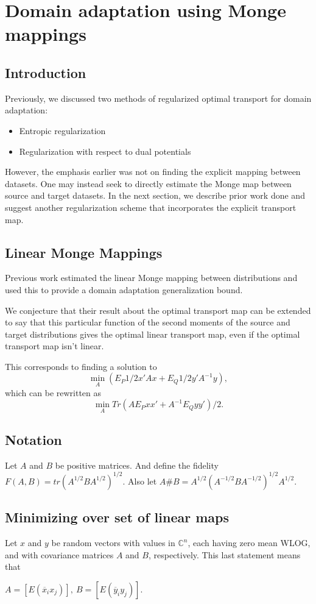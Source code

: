 \chapter{Domain adaptation using Monge mappings}

\section*{Introduction}
Previously, we discussed two methods of regularized optimal transport for domain adaptation:
\begin{itemize}
	\item Entropic regularization
	\item Regularization with respect to dual potentials
\end{itemize}

However, the emphasis earlier was not on finding the explicit mapping between datasets. One may instead seek to directly estimate the Monge map between source and target datasets. In the next section, we describe prior work done and suggest another regularization scheme that incorporates the explicit transport map.

\section*{Linear Monge Mappings}
Previous work \cite{Flamary2019} estimated the linear Monge mapping between distributions and used this to provide a domain adaptation generalization bound.

We conjecture that their result about the optimal transport map can be extended to say that this particular function of the second moments of the source and target distributions gives the optimal linear transport map, even if the optimal transport map isn't linear.

This corresponds to finding a solution to
$$\min_A (E_P 1/2 x'Ax + E_Q 1/2 y'A^{-1}y),$$ which can be rewritten as 
$$\min_A Tr(A E_P xx' + A^{-1} E_Q yy')/2.$$

\section*{Notation}

Let $A$ and $B$ be positive matrices. And define the fidelity $F(A,B) = tr(A^{1/2}BA^{1/2})^{1/2}$. Also let $A\#B=A^{1/2}(A^{-1/2}BA^{-1/2})^{1/2}A^{1/2}$.

\section*{Minimizing over set of linear maps \cite{Bhatia2019}}
Let $x$ and $y$ be random vectors with values in $\mathbb{C}^{n}$, each having zero mean WLOG, and with covariance matrices $A$ and $B$, respectively. This last statement means that
\begin{center}
	$A=[E(\overline{x}_{i}x_{j})],\ B=[E(\overline{y}_{i}y_{j})]$.
\end{center}

